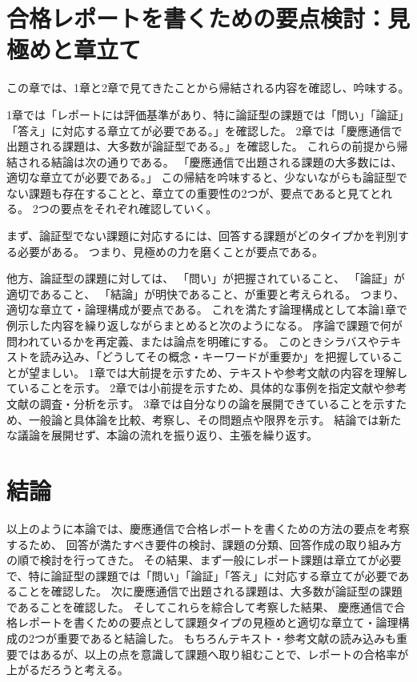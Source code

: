 \documentclass[11pt,a4paper,uplatex]{jsarticle}
\begin{document}
\section{合格レポートを書くための要点検討：見極めと章立て}

この章では、1章と2章で見てきたことから帰結される内容を確認し、吟味する。

1章では「レポートには評価基準があり、特に論証型の課題では「問い」「論証」「答え」に対応する章立てが必要である。」を確認した。
2章では「慶應通信で出題される課題は、大多数が論証型である。」を確認した。
これらの前提から帰結される結論は次の通りである。
「慶應通信で出題される課題の大多数には、適切な章立てが必要である。」
この帰結を吟味すると、少ないながらも論証型でない課題も存在することと、章立ての重要性の2つが、要点であると見てとれる。
2つの要点をそれぞれ確認していく。

まず、論証型でない課題に対応するには、回答する課題がどのタイプかを判別する必要がある。
つまり、見極めの力を磨くことが要点である。

他方、論証型の課題に対しては、 「問い」が把握されていること、
「論証」が適切であること、
「結論」が明快であること、が重要と考えられる。
つまり、適切な章立て・論理構成が要点である。
これを満たす論理構成として本論1章で例示した内容を繰り返しながらまとめると次のようになる。
序論で課題で何が問われているかを再定義、または論点を明確にする。
このときシラバスやテキストを読み込み、「どうしてその概念・キーワードが重要か」を把握していることが望ましい。
1章では大前提を示すため、テキストや参考文献の内容を理解していることを示す。
2章では小前提を示すため、具体的な事例を指定文献や参考文献の調査・分析を示す。
3章では自分なりの論を展開できていることを示すため、一般論と具体論を比較、考察し、その問題点や限界を示す。
結論では新たな議論を展開せず、本論の流れを振り返り、主張を繰り返す。

\section*{結論}

以上のように本論では、慶應通信で合格レポートを書くための方法の要点を考察するため、
回答が満たすべき要件の検討、課題の分類、回答作成の取り組み方の順で検討を行ってきた。
その結果、まず一般にレポート課題は章立てが必要で、特に論証型の課題では「問い」「論証」「答え」に対応する章立てが必要であることを確認した。
次に慶應通信で出題される課題は、大多数が論証型の課題であることを確認した。
そしてこれらを綜合して考察した結果、
慶應通信で合格レポートを書くための要点として課題タイプの見極めと適切な章立て・論理構成の2つが重要であると結論した。
もちろんテキスト・参考文献の読み込みも重要ではあるが、以上の点を意識して課題へ取り組むことで、レポートの合格率が上がるだろうと考える。
\end{document}
